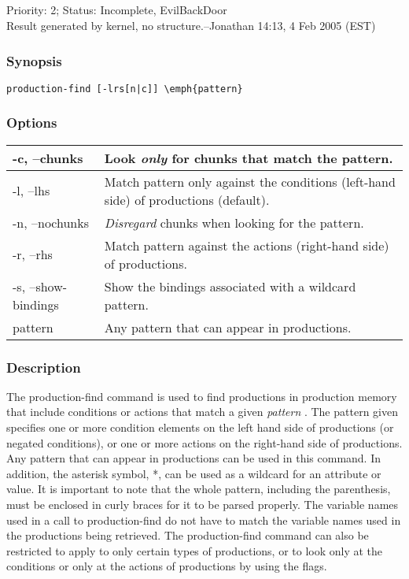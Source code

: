 \subsection{}
\label{production-find}
 Priority: 2; Status: Incomplete, EvilBackDoor\\ 
Result generated by kernel, no structure.--Jonathan 14:13, 4 Feb 2005 (EST) 
\subsubsection*{Synopsis}
\begin{verbatim}
production-find [-lrs[n|c]] \emph{pattern}
\end{verbatim}
\subsubsection*{Options}
\begin{tabular}{|l|l|}
\hline 
 -c, --chunks  & Look \emph{only}
 for chunks that match the pattern.  \\
 \hline 
 -l, --lhs  & Match pattern only against the conditions (left-hand side) of productions (default).  \\
 \hline 
 -n, --nochunks  &\emph{Disregard}
 chunks when looking for the pattern.  \\
 \hline 
 -r, --rhs  & Match pattern against the actions (right-hand side) of productions.  \\
 \hline 
 -s, --show-bindings  & Show the bindings associated with a wildcard pattern.  \\
 \hline 
 pattern  & Any pattern that can appear in productions.  \\
 \hline 
\end{tabular}
\subsubsection*{Description}
 The production-find command is used to find productions in production memory that include conditions or actions that match a given \emph{pattern}
. The pattern given specifies one or more condition elements on the left hand side of productions (or negated conditions), or one or more actions on the right-hand side of productions. Any pattern that can appear in productions can be used in this command. In addition, the asterisk symbol, *, can be used as a wildcard for an attribute or value. It is important to note that the whole pattern, including the parenthesis, must be enclosed in curly braces for it to be parsed properly. 
 The variable names used in a call to production-find do not have to match the variable names used in the productions being retrieved. 
 The production-find command can also be restricted to apply to only certain types of productions, or to look only at the conditions or only at the actions of productions by using the flags. 
